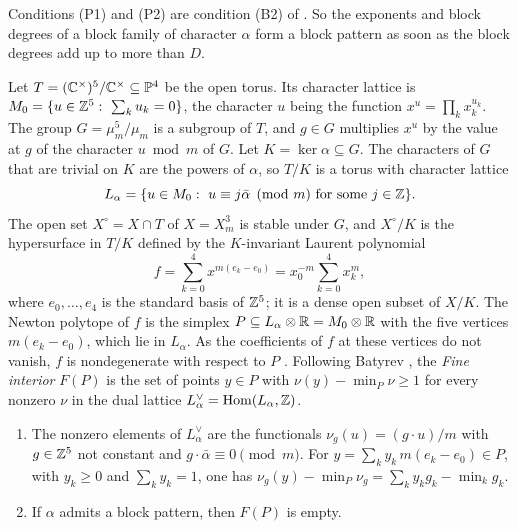 Conditions (P1) and (P2) are condition (B2) of . So
the exponents and block degrees of a block family of character $\alpha$
form a block pattern as soon as the block degrees add up to more than $D$.

Let $T=(\mathbb{C}^{\times})^{5}/\mathbb{C}^{\times}\subseteq\mathbb{P}^{4}$ be the open torus.
Its character lattice is $M_{0}=\{u\in\mathbb{Z}^{5}:\ \sum_{k}u_{k}=0\}$, the
character $u$ being the function $x^{u}=\prod_{k}x_{k}^{u_{k}}$. The group
$G=\mu_{m}^{5}/\mu_{m}$ is a subgroup of $T$, and $g\in G$ multiplies $x^{u}$
by the value at $g$ of the character $u\bmod m$ of $G$. Let $K=\ker\alpha
\subseteq G$. The characters of $G$ that are trivial on $K$ are the powers
of $\alpha$, so $T/K$ is a torus with character lattice
\[
  L_{\alpha}=\{u\in M_{0}:\ u\equiv j\bar\alpha\pmod m\ \text{for some}\
  j\in\mathbb{Z}\}.
\]
The open set $X^{\circ}=X\cap T$ of $X=X^{3}_{m}$ is stable under $G$, and
$X^{\circ}/K$ is the hypersurface in $T/K$ defined by the $K$-invariant
Laurent polynomial
\[
  f=\sum_{k=0}^{4}x^{m(e_{k}-e_{0})}=x_{0}^{-m}\sum_{k=0}^{4}x_{k}^{m},
\]
where $e_{0},\dots,e_{4}$ is the standard basis of $\mathbb{Z}^{5}$; it is a dense
open subset of $X/K$. The Newton polytope of $f$ is the simplex
$P\subseteq L_{\alpha}\otimes\mathbb{R}=M_{0}\otimes\mathbb{R}$ with the five vertices
$m(e_{k}-e_{0})$, which lie in $L_{\alpha}$. As the coefficients of $f$ at
these vertices do not vanish, $f$ is nondegenerate with respect to $P$
\cite[Example~5.2]{Bat24}. Following Batyrev \cite[Definition~1.2]{Bat24},
the \emph{Fine interior} $F(P)$ is the set of points $y\in P$ with
$\nu(y)-\min_{P}\nu\ge1$ for every nonzero $\nu$ in the dual lattice
$L_{\alpha}^{\vee}=\operatorname{Hom}(L_{\alpha},\mathbb{Z})$.

\begin{lemma}\label{lem:fine}
\begin{enumerate}[label=\textup{(\alph*)}]
\item The nonzero elements of $L_{\alpha}^{\vee}$ are the functionals
$\nu_{g}(u)=(g\cdot u)/m$ with $g\in\mathbb{Z}^{5}$ not constant and $g\cdot
\bar\alpha\equiv0\pmod m$. For $y=\sum_{k}y_{k}\,m(e_{k}-e_{0})\in P$, with
$y_{k}\ge0$ and $\sum_{k}y_{k}=1$, one has $\nu_{g}(y)-\min_{P}\nu_{g}=
\sum_{k}y_{k}g_{k}-\min_{k}g_{k}$.
\item If $\alpha$ admits a block pattern, then $F(P)$ is empty.
\end{enumerate}
\end{lemma}

